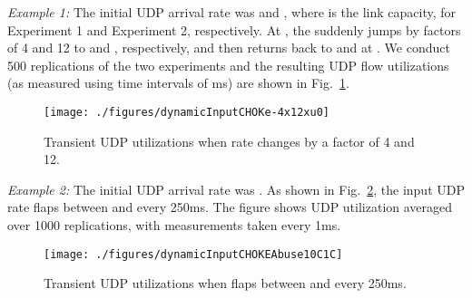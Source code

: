 \documentclass{IEEEtran}
\begin{document}
    \emph{Example 1: }
The initial UDP arrival rate  was  and , where  is the link capacity, for Experiment 1 and Experiment 2, respectively. At , the  suddenly jumps by factors of 4 and 12 to  and , respectively, and then returns back to  and  at . We conduct 500 replications of the two experiments and the resulting UDP flow utilizations (as measured using time intervals of ms) are shown in Fig.~\ref {fig:4x12xUtil}.
      \begin{figure}[h]\centering
           \texttt{[image: ./figures/dynamicInputCHOKe-4x12xu0]}
\caption{Transient UDP utilizations when rate  changes by a factor of 4 and 12.}
        \label{fig:4x12xUtil}\end{figure}

   \emph{Example 2: }
The initial UDP arrival rate was . As shown in Fig.~\ref{fig:x0flap1C10C}, the input UDP rate flaps between  and  every 250ms. The figure shows UDP utilization averaged over 1000 replications, with measurements taken every 1ms. 
      \begin{figure}[h]\centering
        \texttt{[image: ./figures/dynamicInputCHOKEAbuse10C1C]}
        \caption{Transient UDP utilizations when  flaps between  and  every 250ms.}
        \label{fig:x0flap1C10C} \end{figure}
\end{document}
